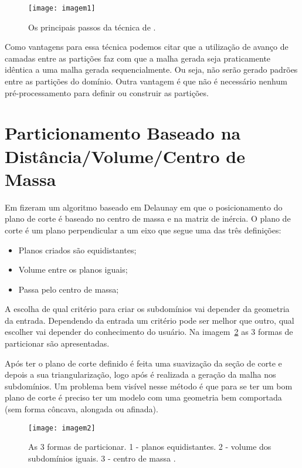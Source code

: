  \begin{figure}[htbp]
     \centering
     \texttt{[image: imagem1]}
     \caption{Os principais passos da técnica de \cite{bib:Pirzadeh09}.}
     \label{fig:imagem1}
 \end{figure}
 
 Como vantagens para essa técnica podemos citar que a utilização de avanço de camadas entre as partições faz com que a malha gerada seja praticamente idêntica a uma malha gerada sequencialmente. Ou seja, não serão gerado padrões entre as partições do domínio. Outra vantagem é que não é necessário nenhum pré-processamento para definir ou construir as partições.

\section{Particionamento Baseado na Distância/Volume/Centro de Massa}
 
Em \cite{bib:Ivanov06} fizeram um algoritmo baseado em Delaunay em que o posicionamento do plano de corte é baseado no centro de massa e na matriz de inércia. O plano de corte é um plano perpendicular a um eixo que segue uma das três definições:

\begin{itemize}
  \item Planos criados são equidistantes;

  \item Volume entre os planos iguais;

  \item Passa pelo centro de massa;
\end{itemize}

A escolha de qual critério para criar os subdomínios vai depender da geometria da entrada. Dependendo da entrada um critério pode ser melhor que outro, qual escolher vai depender do conhecimento do usuário. Na imagem~\ref{fig:imagem2} as 3 formas de particionar são apresentadas.

Após ter o plano de corte definido é feita uma suavização da seção de corte e depois a sua triangularização, logo após é realizada a geração da malha nos subdomínios. Um problema bem visível nesse método é que para se ter um bom plano de corte é preciso ter um modelo com uma geometria bem comportada (sem forma côncava, alongada ou afinada).

 \begin{figure}[htbp]
     \centering
     \texttt{[image: imagem2]}
     \caption{As 3 formas de particionar. 1 - planos equidistantes. 2 - volume dos subdomínios iguais. 3 - centro de massa \cite{bib:Ivanov06}.}
     \label{fig:imagem2}
 \end{figure}

